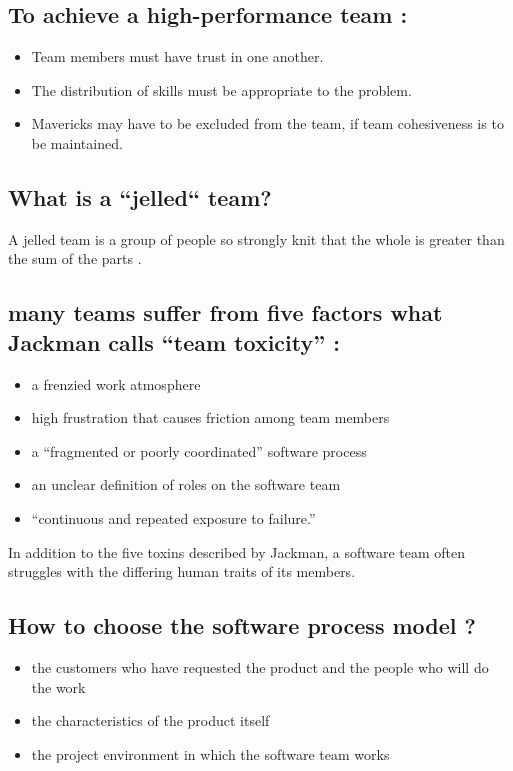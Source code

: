 \documentclass[12pt]{article}
\begin{document}
\subsection{To achieve a high-performance team :}


\begin{itemize}
	\item Team members must have trust in one another.
	\item The distribution of skills must be appropriate to the problem.
	\item Mavericks may have to be excluded from the team, if team cohesiveness is to
be maintained.
\end{itemize}


\subsection{What is a “jelled“ team?}

A jelled team is a group of people so strongly knit that the whole is greater than the
sum of the parts .



\subsection{many teams suffer from five factors what Jackman calls “team toxicity” : }


\begin{itemize}
	\item a frenzied work atmosphere
	\item high frustration that causes friction
among team members
	\item a “fragmented or poorly coordinated” software process
	\item an unclear definition of roles on the software team
	\item “continuous and repeated exposure to failure.”
\end{itemize}


In addition to the five toxins described by Jackman, a software team often struggles with the differing human traits of its members.



\subsection{How to choose the software process model ?}

\begin{itemize}
	\item the customers who have requested the product and the people who will do the work
	\item  the characteristics of the product itself
	\item the project environment in which the
software team works 
\end{itemize}
\end{document}
